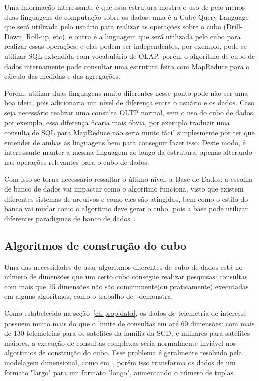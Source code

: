 Uma informação interessante é que esta estrutura mostra o uso de pelo menos duas linguagens de computação sobre os dados: uma é a Cube Query Language que será utilizada pelo usuário para realizar as operações sobre o cubo (Drill-Down, Roll-up, etc), e outra é a linguagem que será utilizada pelo cubo para realizar essas operações, e elas podem ser independentes, por exemplo, pode-se utilizar SQL extendida com vocabulário de OLAP, porém o algoritmo de cubo de dados internamente pode consultar uma estrutura feita com MapReduce para o cálculo das medidas e das agregações.

Porém, utilizar duas linguagens muito diferentes nesse ponto pode não ser uma boa ideia, pois adicionaria um nível de diferença entre o usuário e os dados.
Caso seja necessário realizar uma consulta OLTP normal, sem o uso do cubo de dados, por exemplo, essa diferença ficaria mais óbvia, por exemplo traduzir uma consulta de SQL para MapReduce não seria muito fácil simplesmente por ter que entender de ambas as linguagens bem para conseguir fazer isso.
Deste modo, é interessante manter a mesma linguagem ao longo da estrutura, apenas alterando nas operações relevantes para o cubo de dados.

Com isso se torna necessário ressaltar o último nível, a Base de Dados: a escolha de banco de dados vai impactar como o algoritmo funciona, visto que existem diferentes sistemas de arquivos e como eles são atingidos, bem como o estilo do banco vai mudar como o algoritmo deve gerar o cubo, pois a base pode utilizar diferentes paradigmas de banco de dados~\cite{cuzzocreaDataWarehousingOLAP2013}.

\subsection{Algoritmos de construção do cubo}
\label{ch:prop:cubearch:algo}

Uma das necessidades de usar algoritmos diferentes de cubo de dados está no número de dimensões que um certo cubo consegue realizar pesquisas: consultas com mais que 15 dimensões não são comummente(ou praticamente) executadas em alguns algoritmos, como o trabalho de~\cite{silva:2015:abordagensParaCubo} demonstra.

Como estabelecido na seção~\ref{ch:prop:data}, os dados de telemetria de interesse possuem muito mais do que o limite de consultas em até 60 dimensões: com mais de 130 telemetrias para os satélites da família da SCD, e milhares para satélites maiores, a execução de consultas complexas seria normalmente inviável nos algortimos de construção do cubo.
Esse problema é geralmente resolvido pela modelagem dimensional, como em~\cite{AzevedoAmbr:2010:ArSaTe}, porém isso transforma os dados de um formato "largo" para um formato "longo", aumentando o número de tuplas.

